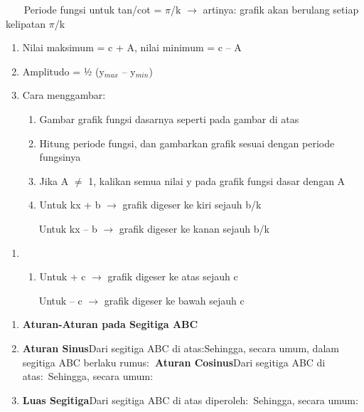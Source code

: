 \documentclass[11pt,fleqn]{book} %
\begin{document}
\noindent ~~~ Periode fungsi untuk tan/cot = $\pi$/k $\mathrm{\to}$ artinya: grafik akan berulang setiap kelipatan $\pi$/k

\begin{enumerate}
\item  Nilai maksimum = c + {\textbar}A{\textbar}, nilai minimum = c -- {\textbar}A{\textbar}

\item  Amplitudo = ½ (y${}_{max}$ -- y${}_{min}$)

\item  Cara menggambar:

\begin{enumerate}
\item  Gambar grafik fungsi dasarnya seperti pada gambar di atas

\item  Hitung periode fungsi, dan gambarkan grafik sesuai dengan periode fungsinya

\item  Jika A $\mathrm{\neq}$ 1, kalikan semua nilai y pada grafik fungsi dasar dengan A

\item  Untuk kx + b $\mathrm{\to}$ grafik digeser ke kiri sejauh b/k
\end{enumerate}
\end{enumerate}

\noindent ~~~~~~ Untuk kx -- b $\mathrm{\to}$ grafik digeser ke kanan sejauh b/k

\begin{enumerate}
\item \begin{enumerate}
\item  Untuk + c $\mathrm{\to}$ grafik digeser ke atas sejauh c
\end{enumerate}
\end{enumerate}

\noindent ~~~~~~ Untuk -- c $\mathrm{\to}$ grafik digeser ke bawah sejauh c

\begin{enumerate}
\item  \textbf{Aturan-Aturan pada Segitiga ABC}

\item  \textbf{Aturan Sinus}Dari segitiga ABC di atas:Sehingga, secara umum, dalam segitiga ABC berlaku rumus:\textbf{~Aturan Cosinus}Dari segitiga ABC di atas:~Sehingga, secara umum:

\item  \textbf{Luas Segitiga}Dari segitiga ABC di atas diperoleh:~Sehingga, secara umum: 
\end{enumerate}
\end{document}
